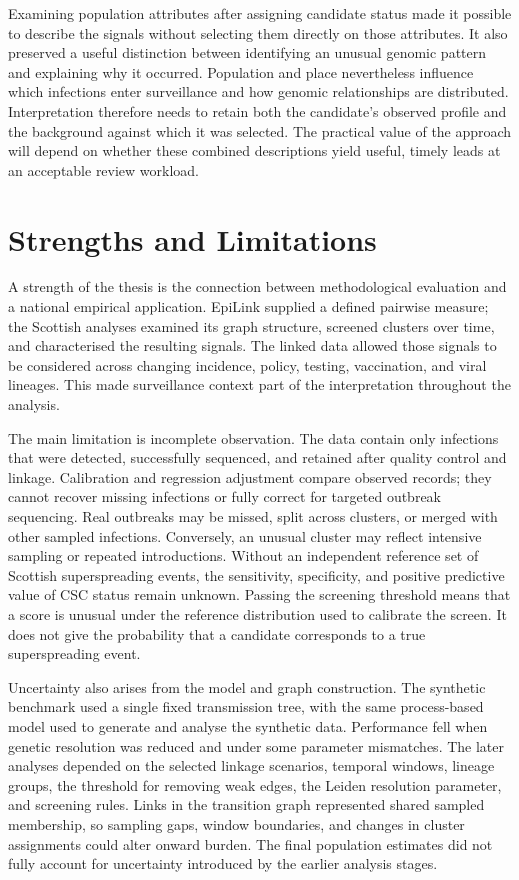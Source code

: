 Examining population attributes after assigning candidate status made it possible to describe the signals without selecting them directly on those attributes. It also preserved a useful distinction between identifying an unusual genomic pattern and explaining why it occurred. Population and place nevertheless influence which infections enter surveillance and how genomic relationships are distributed. Interpretation therefore needs to retain both the candidate's observed profile and the background against which it was selected. The practical value of the approach will depend on whether these combined descriptions yield useful, timely leads at an acceptable review workload.

\section{Strengths and Limitations}\label{sec:ch7_limitations}

A strength of the thesis is the connection between methodological evaluation and a national empirical application. EpiLink supplied a defined pairwise measure; the Scottish analyses examined its graph structure, screened clusters over time, and characterised the resulting signals. The linked data allowed those signals to be considered across changing incidence, policy, testing, vaccination, and viral lineages. This made surveillance context part of the interpretation throughout the analysis.

The main limitation is incomplete observation. The data contain only infections that were detected, successfully sequenced, and retained after quality control and linkage. Calibration and regression adjustment compare observed records; they cannot recover missing infections or fully correct for targeted outbreak sequencing. Real outbreaks may be missed, split across clusters, or merged with other sampled infections. Conversely, an unusual cluster may reflect intensive sampling or repeated introductions. Without an independent reference set of Scottish superspreading events, the sensitivity, specificity, and positive predictive value of CSC status remain unknown. Passing the screening threshold means that a score is unusual under the reference distribution used to calibrate the screen. It does not give the probability that a candidate corresponds to a true superspreading event.

Uncertainty also arises from the model and graph construction. The synthetic benchmark used a single fixed transmission tree, with the same process-based model used to generate and analyse the synthetic data. Performance fell when genetic resolution was reduced and under some parameter mismatches. The later analyses depended on the selected linkage scenarios, temporal windows, lineage groups, the threshold for removing weak edges, the Leiden resolution parameter, and screening rules. Links in the transition graph represented shared sampled membership, so sampling gaps, window boundaries, and changes in cluster assignments could alter onward burden. The final population estimates did not fully account for uncertainty introduced by the earlier analysis stages.

